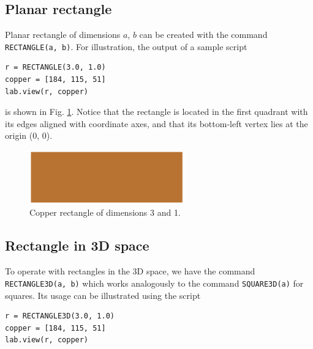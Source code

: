 \subsection{Planar rectangle}

\noindent
Planar rectangle of dimensions $a$, $b$ can be created with the 
command {\tt RECTANGLE(a, b)}. For illustration, the output of a sample script\\

\begin{bbox}
\begin{verbatim}
r = RECTANGLE(3.0, 1.0)
copper = [184, 115, 51]
lab.view(r, copper)
\end{verbatim}
\end{bbox}
\vspace{6mm}

\noindent
is shown in Fig. \ref{fig:cuboid-2}. Notice that the rectangle 
is located in the first quadrant with its edges 
aligned with coordinate axes, and that its bottom-left vertex lies at the 
origin (0, 0).
\newpage

\begin{figure}[!ht]
\begin{center}
\includegraphics[width=0.6\textwidth]{img/cuboid-2.png}
\end{center}
\vspace{-4mm}
\caption{Copper rectangle of dimensions 3 and 1.}
\label{fig:cuboid-2}
\end{figure}
\noindent

\subsection{Rectangle in 3D space}

To operate with rectangles in the 3D space, we have the command {\tt RECTANGLE3D(a, b)}
which works analogously to the command {\tt SQUARE3D(a)} for squares. Its usage
can be illustrated using the script \\

\begin{bbox}
\begin{verbatim}
r = RECTANGLE3D(3.0, 1.0)
copper = [184, 115, 51]
lab.view(r, copper)
\end{verbatim}
\end{bbox}
\vspace{6mm}

